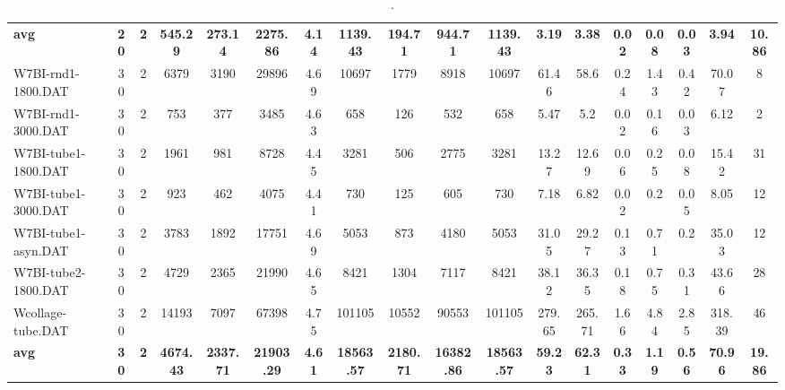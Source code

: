 \begin{sidewaystable}[h]
{\begin{tabular}{lccccccccccccccccc}
\cline{1-18} \textbf{avg} & \textbf{20} & \textbf{2} & \textbf{545.29} & \textbf{273.14} & \textbf{2275.86} & \textbf{4.14} & \textbf{1139.43} & \textbf{194.71} & \textbf{944.71} & \textbf{1139.43} & \textbf{3.19} & \textbf{3.38} & \textbf{0.02} & \textbf{0.08} & \textbf{0.03} & \textbf{3.94} & \textbf{10.86} \\ \cline{1-18}
W7BI-rnd1-1800.DAT & 30 & 2 & 6379 & 3190 & 29896 & 4.69 & 10697 & 1779 & 8918 & 10697 & 61.46 & 58.6 & 0.24 & 1.43 & 0.42 & 70.07 & 8\\
W7BI-rnd1-3000.DAT & 30 & 2 & 753 & 377 & 3485 & 4.63 & 658 & 126 & 532 & 658 & 5.47 & 5.2 & 0.02 & 0.16 & 0.03 & 6.12 & 2\\
W7BI-tube1-1800.DAT & 30 & 2 & 1961 & 981 & 8728 & 4.45 & 3281 & 506 & 2775 & 3281 & 13.27 & 12.69 & 0.06 & 0.25 & 0.08 & 15.42 & 31\\
W7BI-tube1-3000.DAT & 30 & 2 & 923 & 462 & 4075 & 4.41 & 730 & 125 & 605 & 730 & 7.18 & 6.82 & 0.02 & 0.2 & 0.05 & 8.05 & 12\\
W7BI-tube1-asyn.DAT & 30 & 2 & 3783 & 1892 & 17751 & 4.69 & 5053 & 873 & 4180 & 5053 & 31.05 & 29.27 & 0.13 & 0.71 & 0.2 & 35.03 & 12\\
W7BI-tube2-1800.DAT & 30 & 2 & 4729 & 2365 & 21990 & 4.65 & 8421 & 1304 & 7117 & 8421 & 38.12 & 36.35 & 0.18 & 0.75 & 0.31 & 43.66 & 28\\
Wcollage-tube.DAT & 30 & 2 & 14193 & 7097 & 67398 & 4.75 & 101105 & 10552 & 90553 & 101105 & 279.65 & 265.71 & 1.66 & 4.84 & 2.85 & 318.39 & 46\\
\cline{1-18} \textbf{avg} & \textbf{30} & \textbf{2} & \textbf{4674.43} & \textbf{2337.71} & \textbf{21903.29} & \textbf{4.61} & \textbf{18563.57} & \textbf{2180.71} & \textbf{16382.86} & \textbf{18563.57} & \textbf{59.23} & \textbf{62.31} & \textbf{0.33} & \textbf{1.19} & \textbf{0.56} & \textbf{70.96} & \textbf{19.86} \\ \cline{1-18}
\bottomrule
\end{tabular}%
}%
\caption{.}
\label{tab:table_bc}
\end{sidewaystable}

